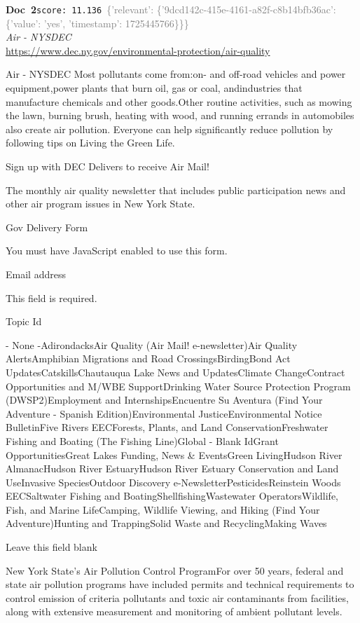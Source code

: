 \documentclass[a4paper,11pt]{article}
\begin{document}
\begin{docenv}
{\footnotesize\textcolor{doccolor}{\textbf{Doc~2}}}\hfill{\tiny\texttt{score:~11.136}}\ {\tiny\textcolor{gray}{\{'relevant': \{'9dcd142c-415e-4161-a82f-c8b14bfb36ac': \{'value': 'yes', 'timestamp': 1725445766\}\}\}}}\\[3pt]
{\small\textit{Air - NYSDEC}}\\[2pt]
{\tiny\url{https://www.dec.ny.gov/environmental-protection/air-quality}}\\[4pt]
{\footnotesize Air - NYSDEC
Most pollutants come from:on- and off-road vehicles and power equipment,power plants that burn oil, gas or coal, andindustries that manufacture chemicals and other goods.Other routine activities, such as mowing the lawn, burning brush, heating with wood, and running errands in automobiles also create air pollution. Everyone can help significantly reduce pollution by following tips on Living the Green Life.

 Sign up with DEC Delivers to receive Air Mail! 
 

 The monthly air quality newsletter that includes public participation news and other air program issues in New York State.
 

Gov Delivery Form

You must have JavaScript enabled to use this form.

Email address

 
 This field is required.
 

Topic Id

 
- None -AdirondacksAir Quality (Air Mail! e-newsletter)Air Quality AlertsAmphibian Migrations and Road CrossingsBirdingBond Act UpdatesCatskillsChautauqua Lake News and UpdatesClimate ChangeContract Opportunities and M/WBE SupportDrinking Water Source Protection Program (DWSP2)Employment and InternshipsEncuentre Su Aventura (Find Your Adventure - Spanish Edition)Environmental JusticeEnvironmental Notice BulletinFive Rivers EECForests, Plants, and Land ConservationFreshwater Fishing and Boating (The Fishing Line)Global - Blank IdGrant OpportunitiesGreat Lakes Funding, News \& EventsGreen LivingHudson River AlmanacHudson River EstuaryHudson River Estuary Conservation and Land UseInvasive SpeciesOutdoor Discovery e-NewsletterPesticidesReinstein Woods EECSaltwater Fishing and BoatingShellfishingWastewater OperatorsWildlife, Fish, and Marine LifeCamping, Wildlife Viewing, and Hiking (Find Your Adventure)Hunting and TrappingSolid Waste and RecyclingMaking Waves

Leave this field blank

 

New York State's Air Pollution Control ProgramFor over 50 years, federal and state air pollution programs have included permits and technical requirements to control emission of criteria pollutants and toxic air contaminants from facilities, along with extensive measurement and monitoring of ambient pollutant levels.}
\end{docenv}
\end{document}
